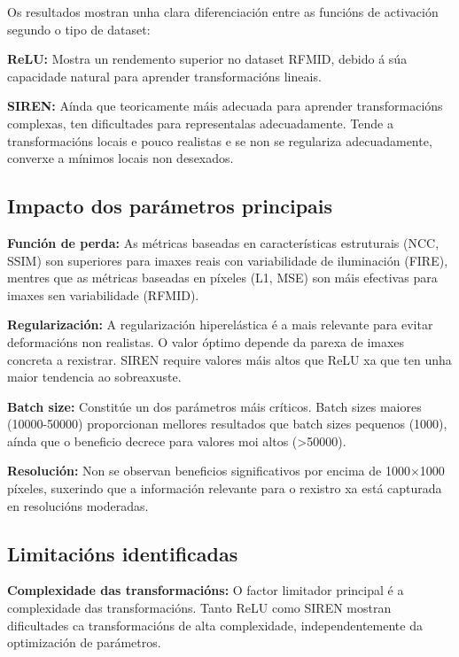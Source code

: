 Os resultados mostran unha clara diferenciación entre as funcións de activación segundo o tipo de dataset:

\textbf{ReLU:} Mostra un rendemento superior no dataset RFMID, debido á súa capacidade natural para aprender transformacións lineais.

\textbf{SIREN:} Aínda que teoricamente máis adecuada para aprender transformacións complexas, ten dificultades para representalas adecuadamente. Tende a transformacións locais e pouco realistas e se non se regulariza adecuadamente, converxe a mínimos locais non desexados.

\subsection{Impacto dos parámetros principais}
\label{subsec:Impacto dos parámetros principais}

\textbf{Función de perda:} As métricas baseadas en características estruturais (NCC, SSIM) son superiores para imaxes reais con variabilidade de iluminación (FIRE), mentres que as métricas baseadas en píxeles (L1, MSE) son máis efectivas para imaxes sen variabilidade (RFMID).

\textbf{Regularización:} A regularización hiperelástica é a mais relevante para evitar deformacións non realistas. O valor óptimo depende da parexa de imaxes concreta a rexistrar. SIREN require valores máis altos que ReLU xa que ten unha maior tendencia ao sobreaxuste.

\textbf{Batch size:} Constitúe un dos parámetros máis críticos. Batch sizes maiores (10000-50000) proporcionan mellores resultados que batch sizes pequenos (1000), aínda que o beneficio decrece para valores moi altos (>50000).

\textbf{Resolución:} Non se observan beneficios significativos por encima de 1000×1000 píxeles, suxerindo que a información relevante para o rexistro xa está capturada en resolucións moderadas.

\subsection{Limitacións identificadas}
\label{subsec:Limitacións identificadas}

\textbf{Complexidade das transformacións:} O factor limitador principal é a complexidade das transformacións. Tanto ReLU como SIREN mostran dificultades ca transformacións de alta complexidade, independentemente da optimización de parámetros.

